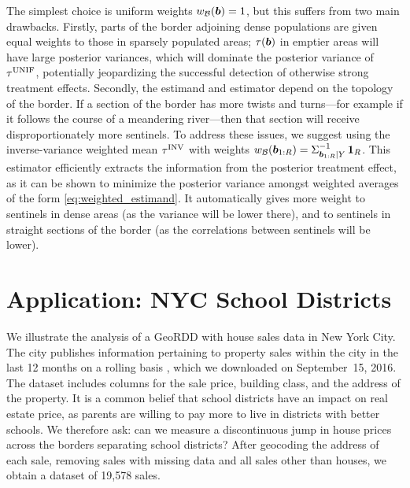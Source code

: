 \documentclass{article}
\begin{document}
The simplest choice is uniform weights \(w_{\mathcal{B}}(\bm{b})=1\), but this suffers from two main drawbacks.
Firstly, parts of the border adjoining dense populations are given equal weights to those in sparsely populated areas;
\(\tau(\bm{b})\) in emptier areas will have large posterior variances, which will dominate the posterior variance of \(\tau^{\mathrm{UNIF}}\), potentially jeopardizing the successful detection of otherwise strong treatment effects.
Secondly, the estimand and estimator depend on the topology of the border.
If a section of the border has more twists and turns---for example if it follows the course of a meandering river---then that section will receive disproportionately more sentinels.
To address these issues, we suggest using the inverse-variance weighted mean \(\tau^{\mathrm{INV}}\) with weights 
\(w_{\mathcal{B}}(\bm{b}_{1:R}) = \Sigma_{\bm{b}_{1:R} \mid Y}^{-1} \operatorname{\mathbf{1}}_{R}\).
This estimator efficiently extracts the information from the posterior treatment effect, as it can be shown to minimize the posterior variance amongst weighted averages of the form \autoref{eq:weighted_estimand}.
It automatically gives more weight to sentinels in dense areas (as the variance will be lower there), and to sentinels in straight sections of the border (as the correlations between sentinels will be lower).

\section{Application: NYC School Districts}
\label{sec:NYC_example}

We illustrate the analysis of a GeoRDD with house sales data in New York City.
The city publishes information pertaining to property sales within the city in the last 12 months on a rolling basis \citep{nyc_data}, which we downloaded on September~15, 2016.
The dataset includes columns for the sale price, building class, and the address of the property.
It is a common belief that school districts have an impact on real estate price, as parents are willing to pay more to live in districts with better schools.
We therefore ask: can we measure a discontinuous jump in house prices across the borders separating school districts?
After geocoding the address of each sale, removing sales with missing data and all sales other than houses, we obtain a dataset of 19,578 sales.
\end{document}
